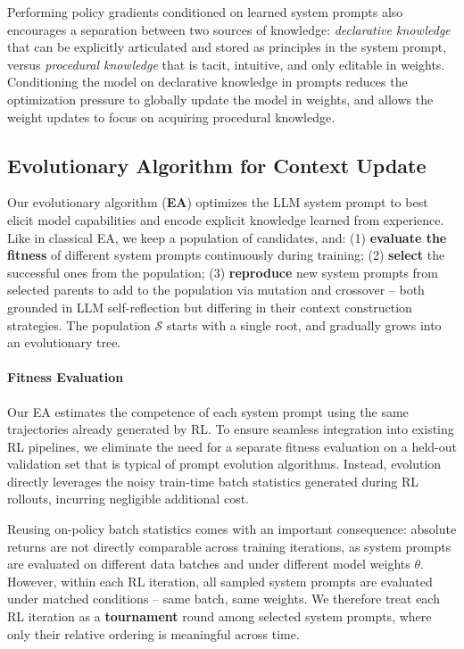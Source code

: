 \documentclass{article}
\theoremstyle{plain}
\theoremstyle{definition}
\theoremstyle{remark}
\begin{document}
Performing policy gradients conditioned on learned system prompts also encourages a separation between two sources of knowledge: \textit{declarative knowledge} that can be explicitly articulated and stored as principles in the system prompt, versus \textit{procedural knowledge} that is tacit, intuitive, and only editable in weights. Conditioning the model on declarative knowledge in prompts reduces the optimization pressure to globally update the model in weights, and allows the weight updates to focus on acquiring procedural knowledge.


\vspace{-5pt}
\subsection{Evolutionary Algorithm for Context Update}
Our evolutionary algorithm (\textbf{EA}) optimizes the LLM system prompt to best elicit model capabilities and encode explicit knowledge learned from experience. Like in classical EA, we keep a population of candidates, and: (1) \textbf{evaluate the fitness} of different system prompts continuously during training; (2) \textbf{select} the successful ones from the population; (3) \textbf{reproduce} new system prompts from selected parents to add to the population via mutation and crossover -- both grounded in LLM self-reflection but differing in their context construction strategies. The population $\mathcal{S}$ starts with a single {root}, and gradually grows into an evolutionary tree.

\vspace{-5pt}
\paragraph{Fitness Evaluation}
Our EA estimates the competence of each system prompt using the same trajectories already generated by RL. 
To ensure seamless integration into existing RL pipelines, we eliminate the need for a separate fitness evaluation on a held-out validation set that is typical of prompt evolution algorithms. Instead, evolution directly leverages the noisy train-time batch statistics generated during RL rollouts, incurring negligible additional cost.

Reusing on-policy batch statistics comes with an important consequence: absolute returns are not directly comparable across training iterations, as system prompts are evaluated on different data batches and under different model weights $\theta$. However, within each RL iteration, all sampled system prompts are evaluated under matched conditions -- same batch, same weights. We therefore treat each RL iteration as a \textbf{tournament} round among selected system prompts, where only their relative ordering is meaningful across time.
\end{document}
